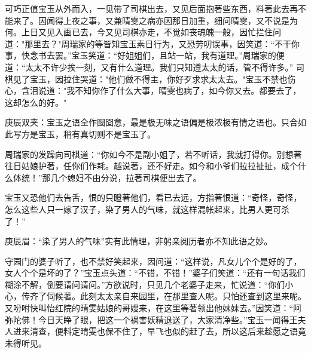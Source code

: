 \begin{parag}
    可巧正值宝玉从外而入，一见带了司棋出去，又见后面抱著些东西，料著此去再不能来了。因闻得上夜之事，又兼晴雯之病亦因那日加重，细问晴雯，又不说是为何。上日又见入画已去，今又见司棋亦走，不觉如丧魂魄一般，因忙拦住问道："那里去？"周瑞家的等皆知宝玉素日行为，又恐劳叨误事，因笑道：“不干你事，快念书去罢。”宝玉笑道：“好姐姐们，且站一站，我有道理。”周瑞家的便道：“太太不许少挨一刻，又有什么道理。我们只知遵太太的话，管不得许多。” 司棋见了宝玉，因拉住哭道："他们做不得主，你好歹求求太太去。"宝玉不禁也伤心，含泪说道："我不知你作了什么大事，晴雯也病了，如今你又去。都要去了，这却怎么的好。"\begin{note}庚辰双夹：宝玉之语全作囫囵意，最是极无味之语偏是极浓极有情之语也。只合如此写方是宝玉，稍有真切则不是宝玉了。\end{note}周瑞家的发躁向司棋道：“你如今不是副小姐了，若不听话，我就打得你。别想著往日姑娘护著，任你们作耗。越说著，还不好走。如今和小爷们拉拉扯扯，成个什么体统！”那几个媳妇不由分说，拉著司棋便出去了。
\end{parag}


\begin{parag}
    宝玉又恐他们去告舌，恨的只瞪著他们，看已去远，方指著恨道：“奇怪，奇怪，怎么这些人只一嫁了汉子，染了男人的气味，就这样混帐起来，比男人更可杀了！”\begin{note}庚辰眉：“染了男人的气味”实有此情理，非躬亲阅历者亦不知此语之妙。\end{note}守园门的婆子听了，也不禁好笑起来，因问道：“这样说，凡女儿个个是好的了，女人个个是坏的了？”宝玉点头道：“不错，不错！”婆子们笑道：“还有一句话我们糊涂不解，倒要请问请问。”方欲说时，只见几个老婆子走来，忙说道：“你们小心，传齐了伺候著。此刻太太亲自来园里，在那里查人呢。只怕还查到这里来呢。又吩咐快叫怡红院的晴雯姑娘的哥嫂来，在这里等著领出他妹妹去。”因笑道：“阿弥陀佛！今日天睁了眼，把这一个祸害妖精退送了，大家清净些。”宝玉一闻得王夫人进来清查，便料定晴雯也保不住了，早飞也似的赶了去，所以这后来趁愿之语竟未得听见。
\end{parag}


